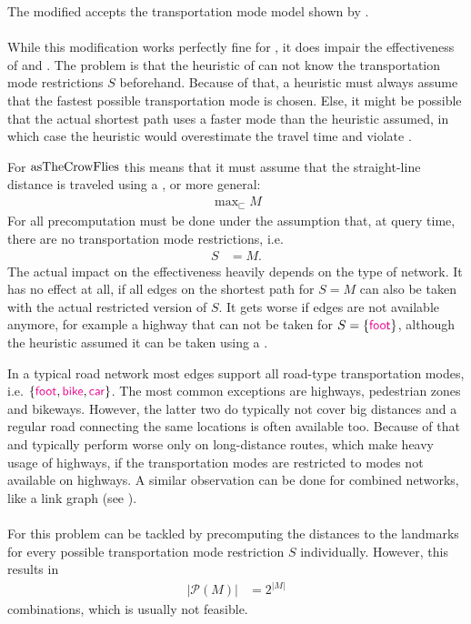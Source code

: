 	The modified \dijkstra accepts the transportation mode model shown by .\\\\
	While this modification works perfectly fine for \dijkstra, it does impair the effectiveness of \astar and \alt. The problem is that
	the heuristic of \astar can not know the transportation mode restrictions $S$ beforehand. Because of that, a heuristic must
	always assume that the fastest possible transportation mode is chosen. Else, it might be possible that the actual shortest
	path uses a faster mode than the heuristic assumed, in which case the
	heuristic would overestimate the travel time and violate .
	
	For $\operatorname{asTheCrowFlies}$ this means that it must assume that the straight-line distance is traveled using a \car, or more general:
	\begin{align*}
		\max\nolimits_{\sqsubset} M
	\end{align*}
	For \alt all precomputation must be done under the assumption that, at query time, there are no transportation
	mode restrictions, i.e.
	\begin{align*}
		S	&= M.
	\end{align*}
	The actual impact on the effectiveness heavily depends on the type of network. It has no effect at all, if all edges on
	the shortest path for $S = M$ can also be taken with the actual restricted version of $S$. It gets worse if edges are
	not available anymore, for example a highway that can not be taken for $S = \{\textcolor{magenta}{\textsf{foot}}\}$, although the heuristic assumed
	it can be taken using a \car.
	
	In a typical road network most edges support all road-type transportation modes, i.e. $\{\textcolor{magenta}{\textsf{foot}}, \textcolor{magenta}{\textsf{bike}}, \textcolor{magenta}{\textsf{car}}\}$. The most
	common exceptions are highways, pedestrian zones and bikeways. However, the latter two do typically not cover big distances
	and a regular road connecting the same locations is often available too. Because of that \astar and \alt typically perform worse
	only on long-distance routes, which make heavy usage of highways, if the transportation modes are restricted to modes
	not available on highways. A similar observation can be done for combined networks, like a link graph (see ).\\\\
	For \alt this problem can be tackled by precomputing the distances to the landmarks for every possible transportation mode
	restriction $S$ individually. However, this results in
	\begin{align*}
		|\mathcal{P}(M)|	&= 2^{|M|}
	\end{align*}
	combinations, which is usually not feasible.

